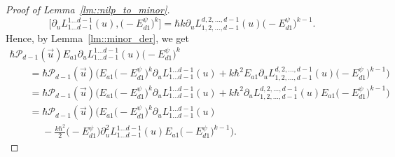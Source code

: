 \documentclass[10pt,a4paper]{article}
\numberwithin{equation}{section}
\newcommand{\calP}{\mathcal{P}}
\begin{document}
\begin{proof}[Proof of Lemma~\ref{lm::nilp_to_minor}]
		\[
		\bigl[\partial_u L_{1\dots d-1}^{1\dots d-1}(u),\bigl(-E_{d1}^{\psi}\bigr)^k\bigr] = \hbar k \partial_u L_{1,2,\dots,d-1}^{d,2,\dots,d-1}(u) \bigl(-E_{d1}^{\psi}\bigr)^{k-1}.
		\]
		Hence, by Lemma~\ref{lm::minor_der}, we get
		\begin{gather}
\hbar \calP_{d-1}(\vec{u})E_{a1} \partial_u L_{1\dots d-1}^{1\dots d-1}(u) \bigl(-E_{d1}^{\psi}\bigr)^k\nonumber \\
			\qquad	=\hbar \calP_{d-1}(\vec{u}) \bigl( E_{a1} \bigl(-E_{d1}^{\psi}\bigr)^k \partial_u L_{1\dots d-1}^{1\dots d-1}(u) + k \hbar^2 E_{a1} \partial_u L_{1,2,\dots,d-1}^{d,2,\dots,d-1}(u) \bigl(-E_{d1}^{\psi}\bigr)^{k-1} \bigr)\nonumber \\
				\qquad= \hbar \calP_{d-1}(\vec{u})\bigl(E_{a1} \bigl(-E_{d1}^{\psi}\bigr)^k \partial_u L_{1\dots d-1}^{1\dots d-1}(u) + k \hbar^2 \partial_u L_{1,2,\dots,d-1}^{d,2,\dots,d-1}(u) E_{a1} \bigl(-E_{d1}^{\psi}\bigr)^{k-1} \bigr)\nonumber\\
			\qquad	= \hbar \calP_{d-1}(\vec{u})\biggl( E_{a1} \bigl(-E_{d1}^{\psi}\bigr)^k \partial_u L_{1\dots d-1}^{1\dots d-1}(u) \nonumber \\
\phantom{\qquad	=}{} - \frac{k\hbar^2}{2} \bigl(-E_{d1}^{\psi}\bigr) \partial^2_u L_{1\dots d-1}^{1\dots d-1}(u) E_{a1} \bigl(-E_{d1}^{\psi}\bigr)^{k-1}\biggr).\label{eq::derivative_past_k_power}
		\end{gather}
		

\end{proof}
\end{document}

